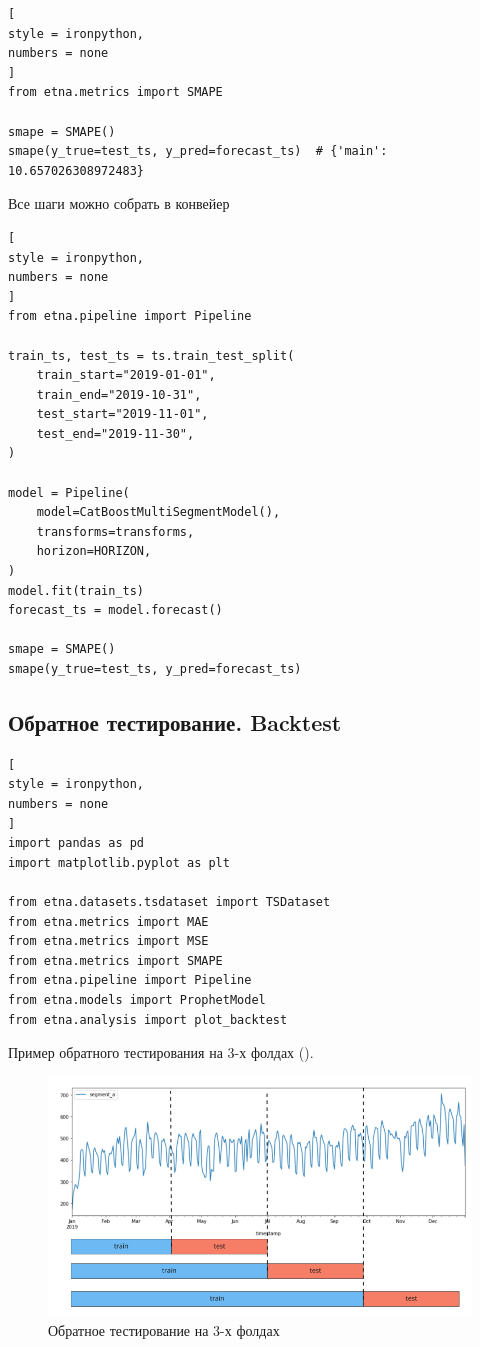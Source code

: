 \documentclass[%
	11pt,
	a4paper,
	utf8,
		]{article}
\begin{document}
\begin{lstlisting}[
style = ironpython,
numbers = none
]
from etna.metrics import SMAPE

smape = SMAPE()
smape(y_true=test_ts, y_pred=forecast_ts)  # {'main': 10.657026308972483}
\end{lstlisting}

Все шаги можно собрать в конвейер
\begin{lstlisting}[
style = ironpython,
numbers = none	
]
from etna.pipeline import Pipeline

train_ts, test_ts = ts.train_test_split(
	train_start="2019-01-01",
	train_end="2019-10-31",
	test_start="2019-11-01",
	test_end="2019-11-30",
)

model = Pipeline(
	model=CatBoostMultiSegmentModel(),
	transforms=transforms,
	horizon=HORIZON,
)
model.fit(train_ts)
forecast_ts = model.forecast()

smape = SMAPE()
smape(y_true=test_ts, y_pred=forecast_ts)
\end{lstlisting}

\subsection{Обратное тестирование. Backtest}

\begin{lstlisting}[
style = ironpython,
numbers = none
]
import pandas as pd
import matplotlib.pyplot as plt

from etna.datasets.tsdataset import TSDataset
from etna.metrics import MAE
from etna.metrics import MSE
from etna.metrics import SMAPE
from etna.pipeline import Pipeline
from etna.models import ProphetModel
from etna.analysis import plot_backtest
\end{lstlisting}

Пример обратного тестирования на 3-х фолдах ().

\begin{figure}[h]
	\centering
	\includegraphics[scale=1.0]{figures/backtest.png}
	\caption{ Обратное тестирование на 3-х фолдах }\label{fig:backtest}
\end{figure}
\end{document}
